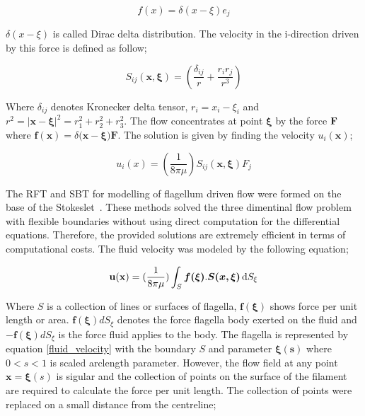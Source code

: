\documentclass[12pt,a4paper,titlepage]{report}
\begin{document}
\begin{equation}
 f (x) = \delta (x - \xi) e_j 
\label{force}
\end{equation}

$\delta (x - \xi)$ is called Dirac delta distribution. The velocity in the i-direction driven by this force is defined
 as follow;


\begin{equation}
 S _{ij} \bm{(x , \xi)} = (\frac{\delta _{ij}}{r} + \frac{r_i r_j}{r^3})
\label{i-direction}
\end{equation}

Where $\delta _{ij}$ denotes Kronecker delta tensor, $r_i = x_i - \xi _i$ and $r^2 =| \bm{x}- \bm{\xi} |^2 = r_1 ^2 + r_2 ^ 2 + r_3 ^2$.
The flow concentrates at point $\bm \xi$ by the force $\bold F$ where $ \bm{f (x)} = \delta (\bm{x} - \bm{\xi) F}$.
The solution is given by finding the velocity $u_i(\bm x)$;

\begin{equation}
 u_i(x) =(\frac{1}{8 \pi \mu}) S_{ij}\bm{( x, \xi)} F_j
\label{velocity}
\end{equation}

The \ac*{RFT} and  \ac*{SBT} for modelling of flagellum driven 
flow were formed on the base of the Stokeslet~\citep{smith2009boundary}. These methods solved the 
three dimentinal flow problem with flexible boundaries without using direct computation for the differential
equations. Therefore, the provided solutions are extremely efficient in terms of computational costs. The fluid
velocity was modeled by the following equation;
   


\begin{equation}
\bold {u(x)} =(\frac{1}{8 \pi \mu}) \int_S \mathrm \bm{f(\xi)} . \bm{S( x, \xi)}\, \mathrm{d}S_{\xi}
\label{fluid_velocity}
\end{equation}

Where $S$ is a collection of lines or surfaces of flagella, $\bm{f(\xi)}$ shows force per unit length or area.
$\bm{f(\xi)} dS_{\xi}$ denotes the force flagella body exerted on the fluid and $-\bm{f(\xi)} dS_{\xi}$ is the 
force fluid applies to the body. The flagella is represented by equation \ref{fluid_velocity} with the boundary
$S$ and parameter $\bm{\xi (s)}$ where $0 < s <1$ is scaled arclength parameter. However, the flow field
at any point $\bm{x} = \bm{\xi} (s)$ is sigular and the collection of points on the surface of the filament 
are required to calculate the force per unit length. The collection of points were replaced on a small distance 
from the centreline;
\end{document}
